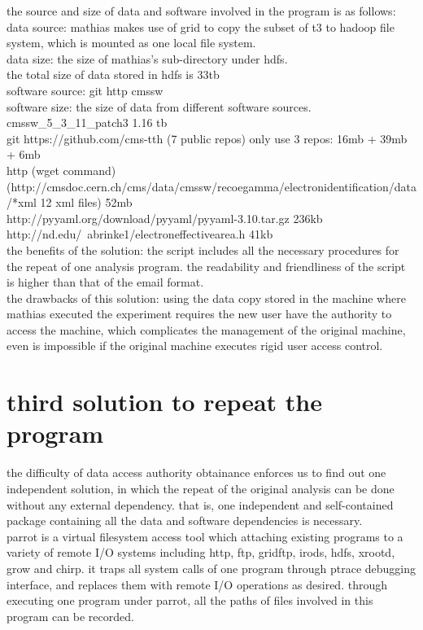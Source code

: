 \documentclass{article}
\begin{document}
the source and size of data and software involved in the program is as follows:\\
data source: mathias makes use of grid to copy the subset of t3 to hadoop file system, which is mounted as one local file system.\\
data size: the size of mathias’s sub-directory under hdfs.\\
the total size of data stored in hdfs is 33tb\\
software source: git http cmssw\\
software size: the size of data from different software sources.\\
cmssw\_5\_3\_11\_patch3          1.16 tb\\
git https://github.com/cms-tth (7 public repos)   only use 3 repos: 16mb + 39mb + 6mb\\
http (wget command)\\
(http://cmsdoc.cern.ch/cms/data/cmssw/recoegamma/electronidentification/data/*xml  12 xml files)  52mb\\
http://pyyaml.org/download/pyyaml/pyyaml-3.10.tar.gz    236kb\\
http://nd.edu/~abrinke1/electroneffectivearea.h      41kb\\
the benefits of the solution: the script includes all the necessary procedures for the repeat of one analysis program. the readability and friendliness of the script is higher than that of the email format.\\

the drawbacks of this solution: using the data copy stored in the machine where mathias executed the experiment requires the new user have the authority to access the machine, which complicates the management of the original machine, even is impossible if the original machine executes rigid user access control.\\

\section{third solution to repeat the program}
\indent the difficulty of data access authority obtainance enforces us to find out one independent solution, in which the repeat of the original analysis can be done without any external dependency. that is, one independent and self-contained package containing all the data and software dependencies is necessary.\\

parrot is a virtual filesystem access tool which attaching existing programs to a variety of remote I/O systems including http, ftp, gridftp, irods, hdfs, xrootd, grow and chirp. it traps all system calls of one program through ptrace debugging interface, and replaces them with remote I/O operations as desired. through executing one program under parrot, all the paths of files involved in this program can be recorded.\\
\end{document}

